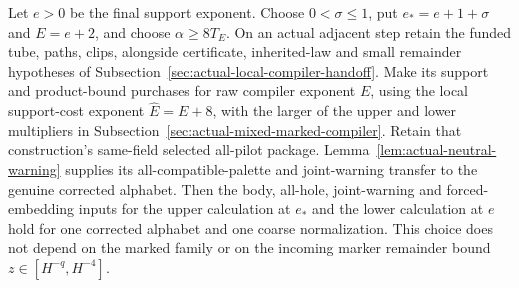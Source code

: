\begin{proposition}
\label{prop:allarity-compiler-reserve}
Let $e>0$ be the final support exponent. Choose $0<\sigma\le1$,
put $e_*=e+1+\sigma$ and $E=e+2$, and choose
$\alpha\ge8T_E$. On an actual adjacent step retain the funded
tube, paths, clips, alongside certificate, inherited-law and small
remainder hypotheses of
Subsection~\ref{sec:actual-local-compiler-handoff}. Make its support
and product-bound purchases for raw compiler exponent $E$, using
the local support-cost exponent $\widehat E=E+8$, with the larger of the upper
and lower multipliers in
Subsection~\ref{sec:actual-mixed-marked-compiler}. Retain that
construction's same-field selected all-pilot package. Lemma~\ref{lem:actual-neutral-warning} supplies its all-compatible-palette and joint-warning transfer to the genuine corrected alphabet.
Then the body, all-hole, joint-warning and forced-embedding inputs
for the upper calculation at $e_*$ and the lower calculation at $e$
hold for one corrected alphabet and one coarse normalization.
This choice does not depend on the marked family or on the incoming
marker remainder bound $z\in[H^{-q},H^{-4}]$.
\end{proposition}
